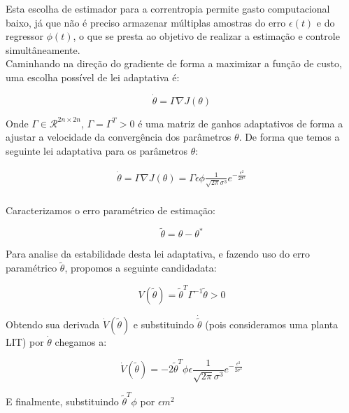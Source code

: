 \documentclass[conference,harvard,brazil,english]{sbatex}
\begin{document}
Esta escolha de estimador para a correntropia permite gasto computacional baixo, já que não é preciso armazenar múltiplas amostras do erro $\epsilon(t)$ e do regressor $\phi(t)$, o que se presta ao objetivo de realizar a estimação e controle simultâneamente.\\

Caminhando na direção do gradiente de forma a maximizar a função de custo, uma escolha possível de lei adaptativa é:

\begin{equation}
\dot{\theta} = \Gamma \nabla J(\theta)
\end{equation}

Onde $\Gamma \in \mathcal{R}^{2n\times2n}$, $\Gamma = \Gamma^T > 0$ é uma matriz de ganhos adaptativos de forma a ajustar a velocidade da convergência dos parâmetros $\theta$. De forma que temos a seguinte lei adaptativa para os parâmetros $\theta$:

\begin{equation}
\displaystyle 
\begin{array}{l}
\dot{\theta} = \Gamma \nabla J(\theta) = \Gamma \epsilon \phi \frac{1}{\sqrt{2\pi}\sigma^3} e^{-\frac{\epsilon^2}{2\sigma^2}}\\
\end{array}
\end{equation}

Caracterizamos o erro paramétrico de estimação:

\begin{equation}
\tilde{\theta} = \theta - \theta^*
\end{equation}

Para analise da estabilidade desta lei adaptativa, e fazendo uso do erro paramétrico $\tilde{\theta}$, propomos a seguinte candidadata:

\begin{equation}
V(\tilde{\theta}) = \tilde{\theta}^T \Gamma^{-1} \tilde{\theta}>0
\end{equation}

Obtendo sua derivada $\dot{V}(\tilde{\theta})$ e substituindo $\dot{\tilde{\theta}}$ (pois consideramos uma planta LIT) por $\dot{\theta}$ chegamos a:

\begin{equation}
\dot{V}(\tilde{\theta}) = -2\tilde{\theta}^T \phi \epsilon \frac{1}{\sqrt{2\pi}\sigma^3}e^{-\frac{\epsilon^2}{2\sigma^2}}
\end{equation}

E finalmente, substituindo $\tilde{\theta}^T\phi$ por $\epsilon m^2$ 
\end{document}
